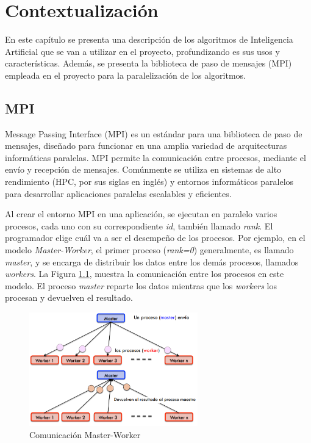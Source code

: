 \chapter{Contextualización}
\label{cap:c2_context}



	En este capítulo se presenta una descripción de los algoritmos de Inteligencia Artificial que se van a utilizar en el proyecto, profundizando es sus usos y características. Además, se presenta la biblioteca de paso de mensajes (MPI) empleada en el proyecto para la paralelización de los algoritmos.
	

\section{MPI}

	Message Passing Interface\cite{barker2015message}  (MPI) es un estándar para una biblioteca de paso de mensajes, diseñado para funcionar en una amplia variedad de arquitecturas informáticas paralelas. MPI permite la comunicación entre procesos, mediante el envío y recepción de mensajes. Comúnmente se utiliza en sistemas de alto rendimiento\cite{stone1990high} (HPC, por sus siglas en inglés) y entornos informáticos paralelos para desarrollar aplicaciones paralelas escalables y eficientes.
	
	
	Al crear el entorno MPI en una aplicación, se ejecutan en paralelo varios procesos, cada uno con su correspondiente \textit{id}, también llamado \textit{rank}. El programador elige cuál va a ser el desempeño de los procesos. Por ejemplo, en el modelo \textit{Master-Worker}, el primer proceso (\textit{rank=0}) generalmente, es llamado \textit{master}, y se encarga de distribuir los datos entre los demás procesos, llamados \textit{workers}. La Figura \ref{fig:comunicacion_mw}, muestra la comunicación entre los procesos en este modelo. El proceso \textit{master} reparte los datos mientras que los \textit{workers} los procesan y devuelven el resultado.


	\begin{figure}[!h]
		\centering
		\includegraphics[width=0.65\textwidth]{images/chapter_2/mpi_1}
		\caption{Comunicación Master-Worker}
		\label{fig:comunicacion_mw}
	\end{figure}

